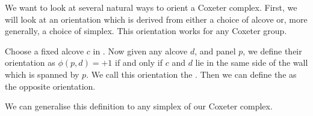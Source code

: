 \documentclass[11pt]{article}
\begin{document}
We want to look at several natural ways to orient a Coxeter complex. First, we will look at an orientation which is derived from either a choice of alcove or, more generally, a choice of simplex. This orientation works for any Coxeter group.

\begin{definition}
    Choose a fixed alcove $c$ in \sg. Now given any alcove $d$, and panel $p$, we define their orientation as $\phi(p,d)=+1$ if and only if $c$ and $d$ lie in the same side of the wall which is spanned by $p$. We call this orientation the . Then we can define the  as the opposite orientation.
\end{definition}

We can generalise this definition to any simplex of our Coxeter complex. 
\end{document}
